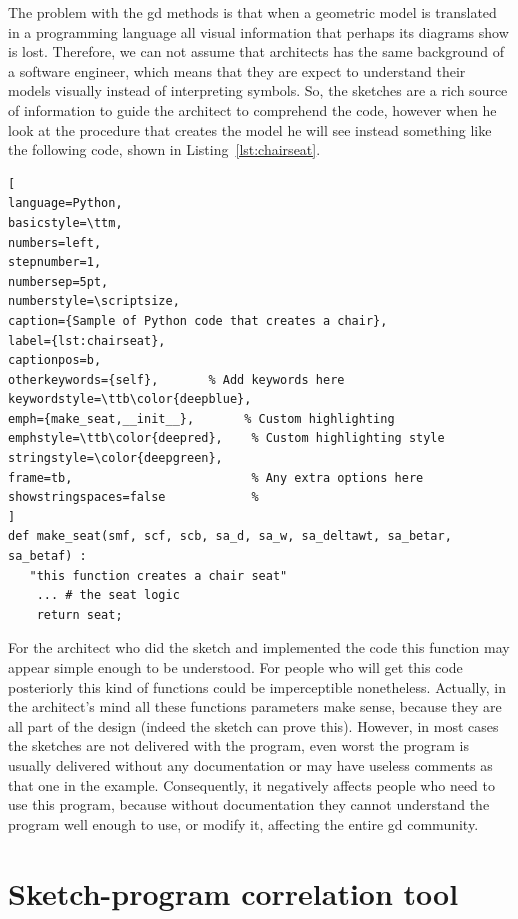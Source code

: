 The problem with the \gls{gd} methods is that when a geometric model is translated in a programming language all visual information that perhaps its diagrams show is lost. Therefore, we can not assume that architects has the same background of a software engineer, which means that they are expect to understand their models visually instead of interpreting symbols. So, the sketches are a rich source of information to guide the architect to comprehend the code, however when he look at the procedure that creates the model he will see instead something like the following code, shown in Listing~\ref{lst:chairseat}. \\ [3mm]

\begin{lstlisting}[
language=Python,
basicstyle=\ttm,
numbers=left,
stepnumber=1,
numbersep=5pt,                   
numberstyle=\scriptsize, 
caption={Sample of Python code that creates a chair},
label={lst:chairseat},
captionpos=b, 
otherkeywords={self},       % Add keywords here
keywordstyle=\ttb\color{deepblue},
emph={make_seat,__init__},       % Custom highlighting
emphstyle=\ttb\color{deepred},    % Custom highlighting style
stringstyle=\color{deepgreen},
frame=tb,                         % Any extra options here
showstringspaces=false            % 
]
def make_seat(smf, scf, scb, sa_d, sa_w, sa_deltawt, sa_betar, sa_betaf) :
   "this function creates a chair seat"
    ... # the seat logic
    return seat;
\end{lstlisting}

For the architect who did the sketch and implemented the code this function may appear simple enough to be understood. For people who will get this code posteriorly this kind of functions could be imperceptible nonetheless. Actually, in the architect's mind all these functions parameters make sense, because they are all part of the design (indeed the sketch can prove this). However, in most cases the sketches are not delivered with the program, even worst the program is usually delivered without any documentation or may have useless comments as that one in the example. Consequently, it negatively affects people who need to use this program, because without documentation they cannot understand the program well enough to use, or modify it, affecting the entire \gls{gd} community. 

\section{Sketch-program correlation tool}
\label{section:sc-tool}

